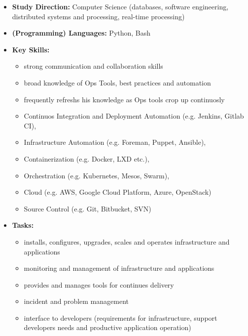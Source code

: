 \begin{itemize}
	\item \textbf{Study Direction:} Computer Science (databases, software engineering, distributed systems and processing, real-time processing)\\
	\item \textbf{(Programming) Languages:} Python, Bash\\
	\item \textbf{Key Skills:} 
	\begin{itemize}
	\item strong communication and collaboration skills
	\item broad knowledge of Ops Tools, best practices and automation
	\item frequently refreshs his knowledge as Ops tools crop up continuosly 
	\item Continuos Integration and Deployment Automation (e.g. Jenkins, Gitlab CI), 
	\item Infrastructure Automation (e.g. Foreman, Puppet, Ansible), 
	\item Containerization (e.g. Docker, LXD etc.), 
	\item Orchestration (e.g. Kubernetes, Mesos, Swarm),
	\item Cloud (e.g. AWS, Google Cloud Platform, Azure, OpenStack)
	\item Source Control (e.g. Git, Bitbucket, SVN)\\
	\end{itemize} 
	\item \textbf{Tasks:} 
	\begin{itemize}
	\item installs, configures, upgrades, scales and operates infrastructure and applications
	\item monitoring and management of infrastructure and applications
	\item provides and manages tools for continues delivery
	\item incident and problem management
	\item interface to developers (requirements for infrastructure, support developers needs and productive application operation)\\
	\end{itemize} 
\end{itemize}

